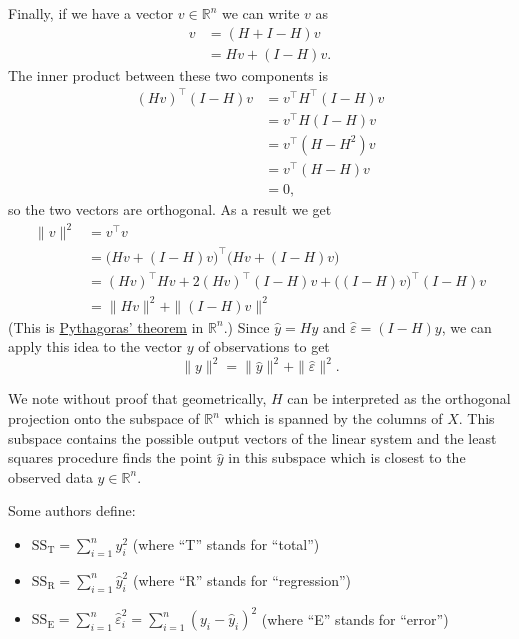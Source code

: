 \documentclass[
  a4paper,
]{article}
\providecommand{\tightlist}{%
  \setlength{\itemsep}{0pt}\setlength{\parskip}{0pt}}
\theoremstyle{definition}
\theoremstyle{definition}
\theoremstyle{definition}
\theoremstyle{definition}
\theoremstyle{remark}
\begin{document}
Finally, if we have a vector \(v \in \mathbb{R}^n\) we can write \(v\) as
\begin{align*}
  v
  &= (H + I - H)v \\
  &= Hv + (I-H)v.
\end{align*}
The inner product between these two components is
\begin{align*}
  (Hv)^\top (I-H)v
  &= v^\top H^\top (I-H) v \\
  &= v^\top H (I-H) v \\
  &= v^\top (H-H^2) v \\
  &= v^\top (H-H) v \\
  &= 0,
\end{align*}
so the two vectors are orthogonal.
As a result we get
\begin{align*}
  \|v\|^2
  &= v^\top v \\
  &= \bigl( Hv + (I-H)v \bigr)^\top \bigl( Hv + (I-H)v \bigr) \\
  &= (Hv)^\top Hv + 2 (Hv)^\top (I-H)v + \bigl((I-H)v\bigr)^\top (I-H)v \\
  &= \| Hv \|^2 + \|(I-H)v \|^2
\end{align*}
(This is \href{https://en.wikipedia.org/wiki/Pythagorean_theorem}{Pythagoras' theorem} in \(\mathbb{R}^n\).)
Since \(\hat y = Hy\) and \(\hat\varepsilon= (I - H)y\), we can apply this idea to the
vector \(y\) of observations to get
\begin{equation}
  \|y\|^2 = \|\hat y\|^2 + \|\hat\varepsilon\|^2.  \label{eq:eps-y-orth}
\end{equation}

We note without proof that geometrically, \(H\) can be interpreted as the
orthogonal projection onto the subspace of \(\mathbb{R}^n\) which is spanned by
the columns of \(X\). This subspace contains the possible output vectors
of the linear system and the least squares procedure finds the point \(\hat y\)
in this subspace which is closest to the observed data \(y\in\mathbb{R}^n\).

Some authors define:

\begin{itemize}
\tightlist
\item
  \(\mathrm{SS}_\mathrm{T} = \sum_{i=1}^n y_i^2\) (where ``T'' stands for ``total'')
\item
  \(\mathrm{SS}_\mathrm{R} = \sum_{i=1}^n \hat y_i^2\) (where ``R'' stands for ``regression'')
\item
  \(\mathrm{SS}_\mathrm{E} = \sum_{i=1}^n \hat\varepsilon_i^2 = \sum_{i=1}^n (y_i-\hat y_i)^2\) (where ``E'' stands for ``error'')
\end{itemize}
\end{document}
